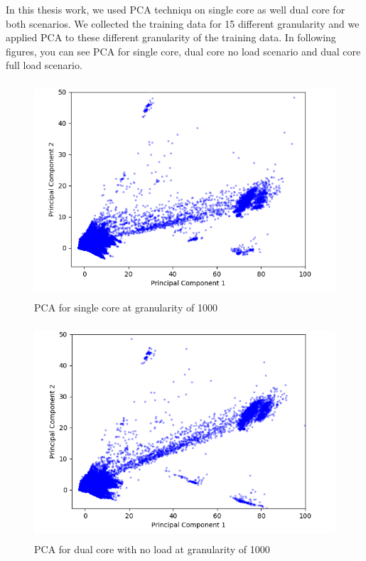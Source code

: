 \par In this thesis work, we used PCA techniqu on single core as well dual core for both scenarios. We collected the training data for 15 different granularity and we applied PCA to these different granularity of the training data. In following figures, you can see PCA for single core, dual core no load scenario and dual core full load scenario. 

\begin{figure}[h!]
\includegraphics[width=12cm, height=8cm]{./images/single_core_pca}
\centering
\caption{PCA for single core at granularity of 1000}
\label{fig:flow}
\end{figure}

\begin{figure}[h!]
\includegraphics[width=12cm, height=8cm]{./images/dual_no_pca}
\centering
\caption{PCA for dual core with no load at granularity of 1000}
\label{fig:flow}
\end{figure}


